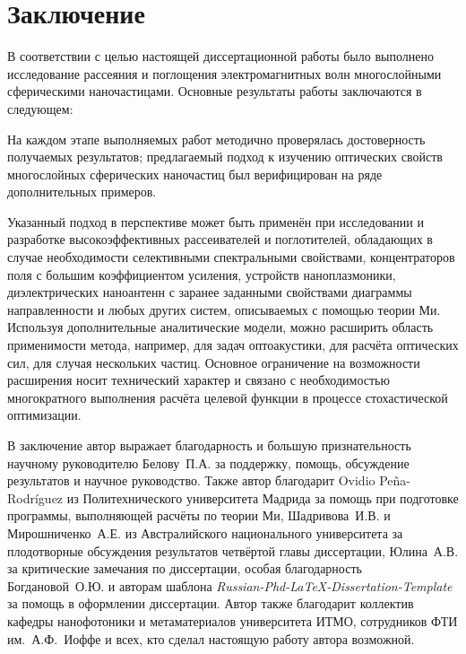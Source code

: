 \chapter*{Заключение}						%

В соответствии с целью настоящей диссертационной работы было выполнено
исследование рассеяния и поглощения электромагнитных волн
многослойными сферическими наночастицами.
Основные результаты работы заключаются в следующем:

На каждом этапе выполняемых работ методично проверялась достоверность
получаемых результатов; предлагаемый подход к изучению оптических
свойств многослойных сферических наночастиц был верифицирован на ряде
дополнительных примеров.

Указанный подход в перспективе может быть применён при исследовании и
разработке высокоэффективных рассеивателей и поглотителей, обладающих
в случае необходимости селективными спектральными свойствами,
концентраторов поля с большим коэффициентом усиления, устройств
наноплазмоники, диэлектрических наноантенн с заранее заданными
свойствами диаграммы направленности и любых других систем, описываемых
с помощью теории Ми. Используя дополнительные аналитические модели,
можно расширить область применимости метода, например, для задач
оптоакустики, для расчёта оптических сил, для случая нескольких
частиц. Основное ограничение на возможности расширения носит
технический характер и связано с необходимостью многократного
выполнения расчёта целевой функции в процессе стохастической
оптимизации.

В заключение автор выражает благодарность и большую признательность
научному руководителю Белову~П.А. за поддержку, помощь, обсуждение
результатов и научное руководство. Также автор благодарит Ovidio
Pe\~{n}a-Rodr\'{i}guez из Политехнического университета Мадрида за
помощь при подготовке программы, выполняющей расчёты по теории Ми,
Шадривова~И.В. и Мирошниченко~А.Е. из Австралийского национального
университета за плодотворные обсуждения результатов четвёртой главы
диссертации, Юлина~А.В. за критические замечания по диссертации,
особая благодарность Богдановой~О.Ю. и авторам шаблона
\textit{Russian-Phd-LaTeX-Dissertation-Template} за помощь в
оформлении диссертации. Автор также благодарит коллектив кафедры
нанофотоники и метаматериалов университета ИТМО, сотрудников ФТИ
им.~А.Ф.~Иоффе и всех, кто сделал настоящую работу автора возможной.
